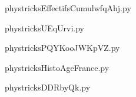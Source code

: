     

    \clearpage
    


    \newcommand{\CaptionFigEffectifsCumulwfqAhj}{<+Type your caption here+>}
    \begin{center}
        
    \end{center}
    phystricksEffectifsCumulwfqAhj.py

    

    \clearpage
    


    \newcommand{\CaptionFigUEqUrvi}{<+Type your caption here+>}
    \begin{center}
        
    \end{center}
    phystricksUEqUrvi.py

    

    \clearpage
    


    \newcommand{\CaptionFigPQYKooJWKpVZ}{<+Type your caption here+>}
    \begin{center}
        
    \end{center}
    phystricksPQYKooJWKpVZ.py

    

    \clearpage
    


    \newcommand{\CaptionFigHistoAgeFrance}{<+Type your caption here+>}
    \begin{center}
        
    \end{center}
    phystricksHistoAgeFrance.py

    

    \clearpage
    


    \newcommand{\CaptionFigDDRbyQk}{<+Type your caption here+>}
    \begin{center}
        
    \end{center}
    phystricksDDRbyQk.py

    

    \clearpage
    


